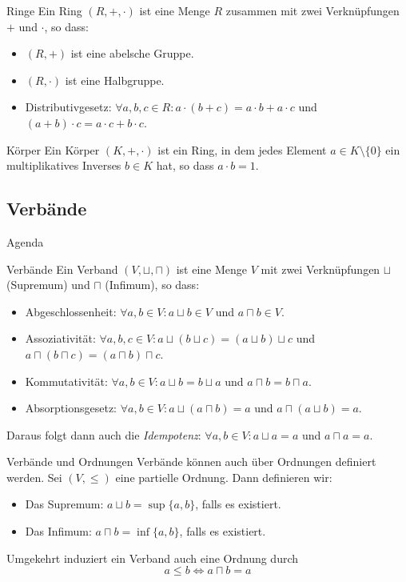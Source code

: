 \documentclass{beamer}
\begin{document}
\begin{frame}{Ringe}
 Ein Ring $(R, +, \cdot)$ ist eine Menge $R$ zusammen mit zwei Verknüpfungen $+$ und $\cdot$, so dass:
 \begin{itemize}
   \item $(R, +)$ ist eine abelsche Gruppe.
   \item $(R, \cdot)$ ist eine Halbgruppe.
   \item Distributivgesetz: $\forall a,b,c \in R: a \cdot (b + c) = a \cdot b + a \cdot c$ und $(a + b) \cdot c = a \cdot c + b \cdot c$.
 \end{itemize}
\end{frame}

\begin{frame}{Körper}
 Ein K\"orper $(K, +, \cdot)$ ist ein Ring, in dem jedes Element $a \in K \setminus \{0\}$ ein multiplikatives Inverses $b \in K$ hat, so dass $a \cdot b = 1$.
\end{frame}

\subsection{Verb\"ande}
\begin{frame}{Agenda}
   
    
  \tableofcontents[currentsection]
  \end{frame}

\begin{frame}{Verb\"ande}
 Ein Verband $(V,\sqcup,\sqcap)$ ist eine Menge $V$ mit zwei Verknüpfungen $\sqcup$ (Supremum) und $\sqcap$ (Infimum), so dass:
 \begin{itemize}
  \item Abgeschlossenheit: $\forall a,b \in V: a \sqcup b \in V$ und $a \sqcap b \in V$.
  \item Assoziativit\"at: $\forall a,b,c \in V: a \sqcup (b \sqcup c) = (a \sqcup b) \sqcup c$ und $a \sqcap (b \sqcap c) = (a \sqcap b) \sqcap c$.
  \item Kommutativit\"at: $\forall a,b \in V: a \sqcup b = b \sqcup a$ und $a \sqcap b = b \sqcap a$.
  \item Absorptionsgesetz: $\forall a,b \in V: a \sqcup (a \sqcap b) = a$ und $a \sqcap (a \sqcup b) = a$.
 \end{itemize}
 Daraus folgt dann auch die \textit{Idempotenz}: $\forall a,b \in V: a \sqcup a = a$ und $a \sqcap a = a$.
\end{frame}
\begin{frame}{Verb\"ande und Ordnungen}
  Verb\"ande k\"onnen auch \"uber Ordnungen definiert werden. Sei $(V, \leq)$ eine partielle Ordnung. Dann definieren wir:
  \begin{itemize}
    \item Das Supremum: $a \sqcup b = \sup\{a,b\}$, falls es existiert.
    \item Das Infimum: $a \sqcap b = \inf\{a,b\}$, falls es existiert.
  \end{itemize}
  Umgekehrt induziert ein Verband auch eine Ordnung durch
     \[a \leq b \Leftrightarrow a \sqcap b = a\]

\end{frame}
\end{document}

